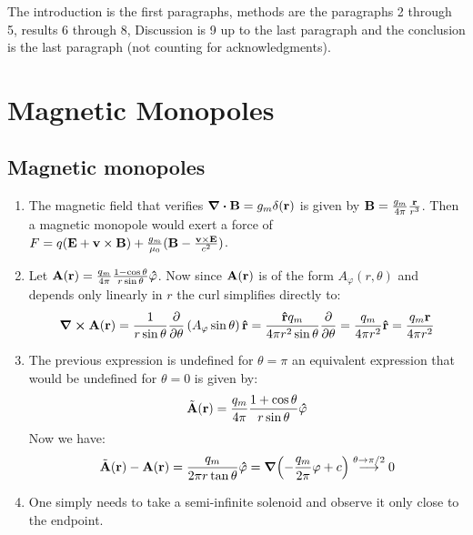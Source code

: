 \documentclass[10pt,a4paper]{book}
\begin{document}
\subsection{}
The introduction is the first paragraphs, methods are the paragraphs 2 through 5, results 6 through 8, Discussion is 9 up to the last paragraph and the conclusion is the last paragraph (not counting for acknowledgments).

\subsection{}

\chapter{Magnetic Monopoles}
\section{Magnetic monopoles}
\begin{enumerate}

\item The magnetic field that verifies $\div \vb{B} = g_m \delta(\vb{r})$ is given by $\vb{B} = \frac{g_m}{4\pi}\frac{\vb{r}}{r^3}$. Then a magnetic monopole would exert a force of $F = q(\vb{E} + \vb{v}\times \vb{B}) + \frac{g_m}{\mu_0}(\vb{B} - \frac{\vb{v} \times \vb{E}}{c^2})$.

\item Let $\vb{A}(\vb{r}) = \frac{q_m}{4\pi}\frac{1 - \cos \theta}{r \sin \theta} \vu{\varphi}$. Now since $\vb{A}(\vb{r})$ is of the form $A_\varphi(r, \theta)$ and depends only linearly in $r$ the curl simplifies directly to:
\[
\curl \vb{A}(\vb{r}) = \frac{1}{r \sin \theta} \pdv{}{\theta}\left( A_\varphi \sin \theta \right) \vu{r} = \frac{\vu{r} q_m}{4 \pi r^2 \sin \theta} \pdv{}{\theta} (1 - \cos \theta) = \frac{q_m}{4 \pi r^2} \vu{r} = \frac{q_m \vb{r}}{4 \pi r^2 }
\]

\item The previous expression is undefined for $\theta = \pi$ an equivalent expression that would be undefined for $\theta = 0$ is given by:
\[
\tilde{\vb{A}}(\vb{r}) = \frac{q_m}{4\pi} \frac{1 + \cos \theta}{r \sin \theta} \vu{\varphi}
\]
Now we have:
\[
\tilde{\vb{A}}(\vb{r}) - \vb{A}(\vb{r}) = \frac{q_m}{2 \pi r \tan \theta} \vu{\varphi} = \grad(-\frac{q_m}{2\pi} \varphi + c) \stackrel{\theta \to \pi/2}{\longrightarrow} 0
\]

\item One simply needs to take a semi-infinite solenoid and observe it only close to the endpoint.

\end{enumerate}
\end{document}
